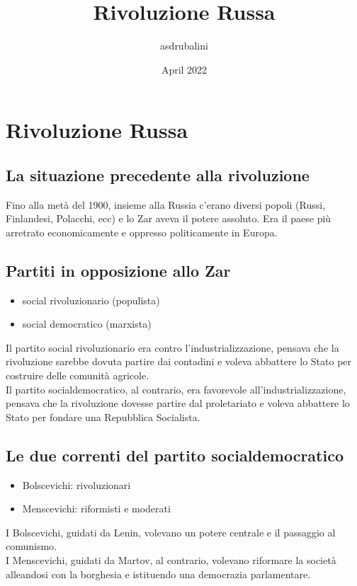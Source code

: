 \documentclass{article}
\title{Rivoluzione Russa}
\author{asdrubalini}
\date{April 2022}
\begin{document}
\maketitle

\section{Rivoluzione Russa}

\subsection{La situazione precedente alla rivoluzione}
Fino alla metà del 1900, insieme alla Russia c'erano diversi popoli (Russi, Finlandesi, Polacchi, ecc) e lo Zar aveva il potere assoluto. Era il paese più arretrato economicamente e oppresso politicamente in Europa.\\

\subsection{Partiti in opposizione allo Zar}

\begin{itemize}
    \item social rivoluzionario (populista)
    \item social democratico (marxista)
\end{itemize}

Il partito social rivoluzionario era contro l'industrializzazione, pensava che la
rivoluzione sarebbe dovuta partire dai contadini e voleva abbattere lo Stato per costruire
delle comunità agricole.\\
Il partito socialdemocratico, al contrario, era favorevole all'industrializzazione,
pensava che la rivoluzione dovesse partire dal proletariato e voleva abbattere lo
Stato per fondare una Repubblica Socialista.

\subsection{Le due correnti del partito socialdemocratico}
\begin{itemize}
    \item Bolscevichi: rivoluzionari
    \item Menscevichi: riformisti e moderati
\end{itemize}

I Bolscevichi, guidati da Lenin, volevano un potere centrale e il passaggio al comunismo.\\
I Menscevichi, guidati da Martov, al contrario, volevano riformare la società alleandosi
con la borghesia e istituendo una democrazia parlamentare.
\end{document}
